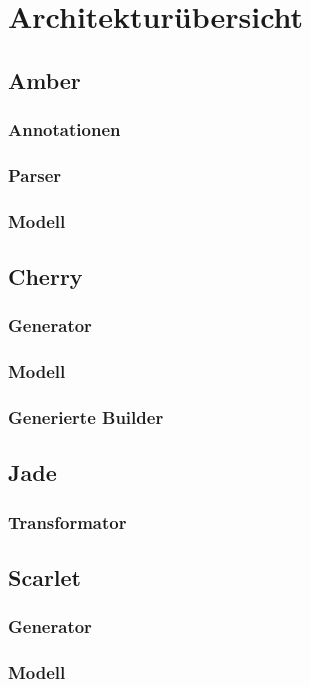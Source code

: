 \documentclass[12pt,oneside,a4paper,parskip]{scrbook}
\begin{document}
\section{Architekturübersicht}
\subsection{Amber}
\subsubsection{Annotationen}
\subsubsection{Parser}
\subsubsection{Modell}
\subsection{Cherry}
\subsubsection{Generator}
\subsubsection{Modell}
\subsubsection{Generierte Builder}
\subsection{Jade}
\subsubsection{Transformator}
\subsection{Scarlet}
\subsubsection{Generator}
\subsubsection{Modell}
\end{document}
